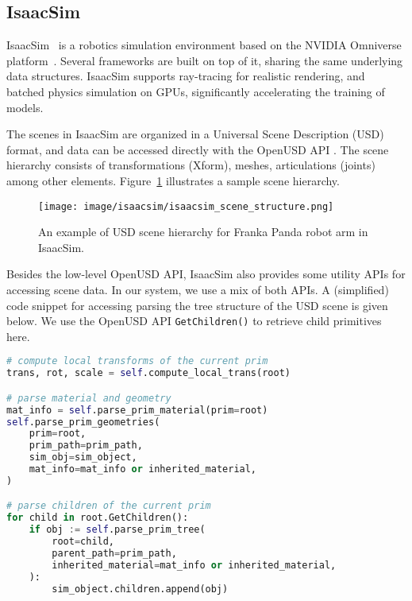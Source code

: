 \subsection{IsaacSim}

IsaacSim~\cite{nvidia_isaac_sim} is a robotics simulation environment based on the NVIDIA Omniverse platform~\cite{nvidia_omniverse}.
Several frameworks \cite{mittal2023orbit,gong2023arnold} are built on top of it, sharing the same underlying data structures.
IsaacSim supports ray-tracing for realistic rendering, and batched physics simulation on GPUs, significantly accelerating the training of models.

The scenes in IsaacSim are organized in a Universal Scene Description (USD) format, and data can be accessed directly with the OpenUSD API \cite{pixarUSD}.
The scene hierarchy consists of transformations (Xform), meshes, articulations (joints) among other elements. Figure~\ref{fig:isaacsim-tree} illustrates a sample scene hierarchy.

\begin{figure}[h]
    \centering
    \texttt{[image: image/isaacsim/isaacsim\_scene\_structure.png]}
    \caption{An example of USD scene hierarchy for Franka Panda robot arm in IsaacSim.}
    \label{fig:isaacsim-tree}
\end{figure}

Besides the low-level OpenUSD API, IsaacSim also provides some utility APIs for accessing scene data. In our system, we use a mix of both APIs. A (simplified) code snippet for accessing parsing the tree structure of the USD scene is given below. We use the OpenUSD API \texttt{GetChildren()} to retrieve child primitives here.

\begin{lstlisting}[language=Python]
# compute local transforms of the current prim
trans, rot, scale = self.compute_local_trans(root)

# parse material and geometry
mat_info = self.parse_prim_material(prim=root)
self.parse_prim_geometries(
    prim=root,
    prim_path=prim_path,
    sim_obj=sim_object,
    mat_info=mat_info or inherited_material,
)

# parse children of the current prim
for child in root.GetChildren():
    if obj := self.parse_prim_tree(
        root=child,
        parent_path=prim_path,
        inherited_material=mat_info or inherited_material,
    ):
        sim_object.children.append(obj)
\end{lstlisting}


